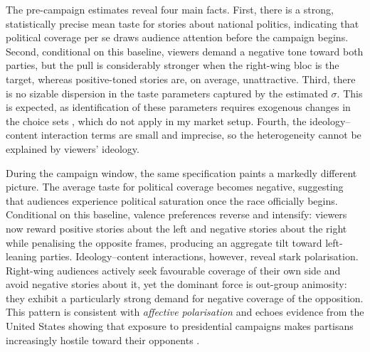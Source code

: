 \documentclass[12pt]{article}
\begin{document}
	The pre-campaign estimates reveal four main facts. First, there is a strong, statistically precise mean taste for stories about national politics, indicating that political coverage per se draws audience attention before the campaign begins. Second, conditional on this baseline, viewers demand a negative tone toward both parties, but the pull is considerably stronger when the right-wing bloc is the target, whereas positive-toned stories are, on average, unattractive. Third, there is no sizable dispersion in the taste parameters captured by the estimated $\sigma$. This is expected, as identification of these parameters requires exogenous changes in the choice sets \citep{berry_haile}, which do not apply in my market setup. Fourth, the ideology–content interaction terms are small and imprecise, so the heterogeneity cannot be explained by viewers’ ideology.
	
	During the campaign window, the same specification paints a markedly different picture. The average taste for political coverage becomes negative, suggesting that audiences experience political saturation once the race officially begins. Conditional on this baseline, valence preferences reverse and intensify: viewers now reward positive stories about the left and negative stories about the right while penalising the opposite frames, producing an aggregate tilt toward left-leaning parties. Ideology–content interactions, however, reveal stark polarisation. Right-wing audiences actively seek favourable coverage of their own side and avoid negative stories about it, yet the dominant force is out-group animosity: they exhibit a particularly strong demand for negative coverage of the opposition. This pattern is consistent with \emph{affective polarisation} and echoes evidence from the United States showing that exposure to presidential campaigns makes partisans increasingly hostile toward their opponents \citep{Peterson2017Echo}.
	
	
	
	
	
\end{document}
